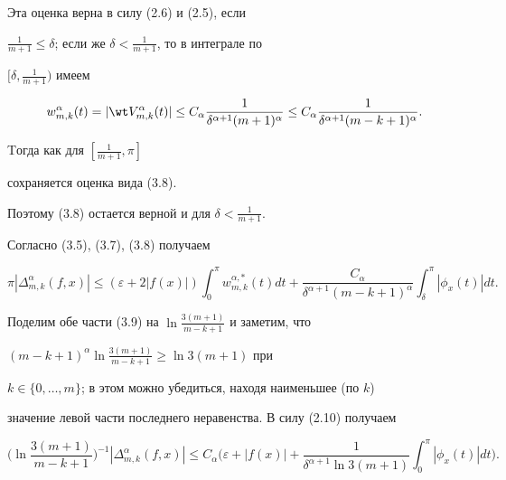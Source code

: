Эта оценка верна в силу (2.6) и (2.5), если


$\frac {1}{m+1}\le\delta$; если же $\delta<\frac {1}{m+1}$, то в интеграле по


$[\delta,\frac {1}{m+1})$ имеем


$$


w_{m,k}^{\alpha}(t)=|\wt V_{m,k}^{\alpha}(t)|\le


C_{\alpha}\frac {1}{\delta^{\alpha+1}(m+1)^{\alpha}}


\le C_{\alpha}\frac {1}{\delta^{\alpha+1}(m-k+1)^{\alpha}}.


$$


Tогда как для $[\frac {1}{m+1},\pi]$


сохраняется оценка вида (3.8).


Поэтому (3.8) остается верной и для $\delta<\frac {1}{m+1}$.





Согласно (3.5), (3.7), (3.8) получаем


\begin{equation}


\pi |\Delta_{m,k}^{\alpha}(f,x)|\le


(\varepsilon +2|f(x)|)\int_0^\pi w_{m,k}^{\alpha,*}(t)dt +


\frac {C_{\alpha}}{\delta^{\alpha+1}(m-k+1)^{\alpha}}


\int_\delta^\pi |\phi_x (t)|dt.


\end{equation}


Поделим обе части (3.9) на $\ln \frac{3(m+1)}{m-k+1}$ и заметим, что 


$(m-k+1)^\alpha \ln \frac{3(m+1)}{m-k+1}\ge \ln {3(m+1)}$ при\linebreak


$k\in\{0,\dotsc,m\}$; в этом можно убедиться, находя наименьшее (по $k$)


значение левой части последнего неравенства. В силу (2.10) получаем


\begin{equation*}


\bigg(\ln \frac{3(m+1)}{m-k+1}\bigg)^{-1} |\Delta_{m,k}^{\alpha}(f,x)|\le


C_\alpha \bigg(\varepsilon + |f(x)|+\frac{1}{\delta^{\alpha+1}\ln {3(m+1)}}


\int_0^\pi |\phi_x(t)|dt \bigg).


\end{equation*}


